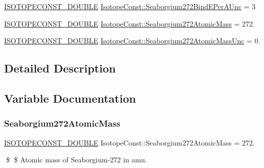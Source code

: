 \begin{DoxyCompactItemize}
\mbox{\hyperlink{group___isotope_const-_macros_ga8f45a7272ce02c0b4c65c44636ed719a}{I\+S\+O\+T\+O\+P\+E\+C\+O\+N\+S\+T\+\_\+\+D\+O\+U\+B\+LE}} \mbox{\hyperlink{group___isotope_const-_seaborgium-_sg272_ga3fc9c779a8b732e7f76b634f54ff6c61}{Isotope\+Const\+::\+Seaborgium272\+Bind\+E\+Per\+A\+Unc}} = 3
\item 
\mbox{\hyperlink{group___isotope_const-_macros_ga8f45a7272ce02c0b4c65c44636ed719a}{I\+S\+O\+T\+O\+P\+E\+C\+O\+N\+S\+T\+\_\+\+D\+O\+U\+B\+LE}} \mbox{\hyperlink{group___isotope_const-_seaborgium-_sg272_gac0f13b92f910c3f555b39c359c56864f}{Isotope\+Const\+::\+Seaborgium272\+Atomic\+Mass}} = 272.
\item 
\mbox{\hyperlink{group___isotope_const-_macros_ga8f45a7272ce02c0b4c65c44636ed719a}{I\+S\+O\+T\+O\+P\+E\+C\+O\+N\+S\+T\+\_\+\+D\+O\+U\+B\+LE}} \mbox{\hyperlink{group___isotope_const-_seaborgium-_sg272_ga5b290099a7d41cd0a779674d5151b680}{Isotope\+Const\+::\+Seaborgium272\+Atomic\+Mass\+Unc}} = 0.
\end{DoxyCompactItemize}


\subsection{Detailed Description}


\subsection{Variable Documentation}
\mbox{\label{group___isotope_const-_seaborgium-_sg272_gac0f13b92f910c3f555b39c359c56864f}} 
\subsubsection{\texorpdfstring{Seaborgium272\+Atomic\+Mass}{Seaborgium272AtomicMass}}
{\footnotesize\ttfamily \mbox{\hyperlink{group___isotope_const-_macros_ga8f45a7272ce02c0b4c65c44636ed719a}{I\+S\+O\+T\+O\+P\+E\+C\+O\+N\+S\+T\+\_\+\+D\+O\+U\+B\+LE}} Isotope\+Const\+::\+Seaborgium272\+Atomic\+Mass = 272.}

\$ \$ Atomic mass of Seaborgium-\/272 in amu. \mbox{\label{group___isotope_const-_seaborgium-_sg272_ga5b290099a7d41cd0a779674d5151b680}} 
